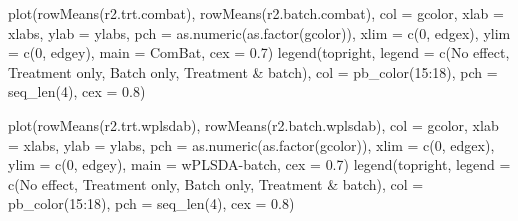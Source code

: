 \documentclass[
]{book}
\newenvironment{Shaded}{\begin{snugshade}}{\end{snugshade}}
\newcommand{\AttributeTok}[1]{\textcolor[rgb]{0.77,0.63,0.00}{#1}}
\newcommand{\DecValTok}[1]{\textcolor[rgb]{0.00,0.00,0.81}{#1}}
\newcommand{\FloatTok}[1]{\textcolor[rgb]{0.00,0.00,0.81}{#1}}
\newcommand{\FunctionTok}[1]{\textcolor[rgb]{0.00,0.00,0.00}{#1}}
\newcommand{\NormalTok}[1]{#1}
\newcommand{\SpecialCharTok}[1]{\textcolor[rgb]{0.00,0.00,0.00}{#1}}
\newcommand{\StringTok}[1]{\textcolor[rgb]{0.31,0.60,0.02}{#1}}
\begin{document}
\begin{Shaded}
\begin{Highlighting}[]
\FunctionTok{plot}\NormalTok{(}\FunctionTok{rowMeans}\NormalTok{(r2.trt.combat), }\FunctionTok{rowMeans}\NormalTok{(r2.batch.combat), }\AttributeTok{col =}\NormalTok{ gcolor, }
     \AttributeTok{xlab =}\NormalTok{ xlabs, }\AttributeTok{ylab =}\NormalTok{ ylabs, }\AttributeTok{pch =} \FunctionTok{as.numeric}\NormalTok{(}\FunctionTok{as.factor}\NormalTok{(gcolor)),}
     \AttributeTok{xlim =} \FunctionTok{c}\NormalTok{(}\DecValTok{0}\NormalTok{, edgex), }\AttributeTok{ylim =} \FunctionTok{c}\NormalTok{(}\DecValTok{0}\NormalTok{, edgey), }\AttributeTok{main =} \StringTok{\textquotesingle{}ComBat\textquotesingle{}}\NormalTok{, }\AttributeTok{cex =} \FloatTok{0.7}\NormalTok{)}
\FunctionTok{legend}\NormalTok{(}\StringTok{\textquotesingle{}topright\textquotesingle{}}\NormalTok{, }\AttributeTok{legend =} \FunctionTok{c}\NormalTok{(}\StringTok{\textquotesingle{}No effect\textquotesingle{}}\NormalTok{, }\StringTok{\textquotesingle{}Treatment only\textquotesingle{}}\NormalTok{, }
                              \StringTok{\textquotesingle{}Batch only\textquotesingle{}}\NormalTok{, }\StringTok{\textquotesingle{}Treatment \& batch\textquotesingle{}}\NormalTok{), }
       \AttributeTok{col =} \FunctionTok{pb\_color}\NormalTok{(}\DecValTok{15}\SpecialCharTok{:}\DecValTok{18}\NormalTok{), }\AttributeTok{pch =} \FunctionTok{seq\_len}\NormalTok{(}\DecValTok{4}\NormalTok{), }\AttributeTok{cex =} \FloatTok{0.8}\NormalTok{)}

\FunctionTok{plot}\NormalTok{(}\FunctionTok{rowMeans}\NormalTok{(r2.trt.wplsdab), }\FunctionTok{rowMeans}\NormalTok{(r2.batch.wplsdab), }\AttributeTok{col =}\NormalTok{ gcolor, }
     \AttributeTok{xlab =}\NormalTok{ xlabs, }\AttributeTok{ylab =}\NormalTok{ ylabs, }\AttributeTok{pch =} \FunctionTok{as.numeric}\NormalTok{(}\FunctionTok{as.factor}\NormalTok{(gcolor)),}
     \AttributeTok{xlim =} \FunctionTok{c}\NormalTok{(}\DecValTok{0}\NormalTok{, edgex), }\AttributeTok{ylim =} \FunctionTok{c}\NormalTok{(}\DecValTok{0}\NormalTok{, edgey), }\AttributeTok{main =} \StringTok{\textquotesingle{}wPLSDA{-}batch\textquotesingle{}}\NormalTok{, }\AttributeTok{cex =} \FloatTok{0.7}\NormalTok{)}
\FunctionTok{legend}\NormalTok{(}\StringTok{\textquotesingle{}topright\textquotesingle{}}\NormalTok{, }\AttributeTok{legend =} \FunctionTok{c}\NormalTok{(}\StringTok{\textquotesingle{}No effect\textquotesingle{}}\NormalTok{, }\StringTok{\textquotesingle{}Treatment only\textquotesingle{}}\NormalTok{, }
                              \StringTok{\textquotesingle{}Batch only\textquotesingle{}}\NormalTok{, }\StringTok{\textquotesingle{}Treatment \& batch\textquotesingle{}}\NormalTok{), }
       \AttributeTok{col =} \FunctionTok{pb\_color}\NormalTok{(}\DecValTok{15}\SpecialCharTok{:}\DecValTok{18}\NormalTok{), }\AttributeTok{pch =} \FunctionTok{seq\_len}\NormalTok{(}\DecValTok{4}\NormalTok{), }\AttributeTok{cex =} \FloatTok{0.8}\NormalTok{)}


\end{Highlighting}
\end{Shaded}
\end{document}
